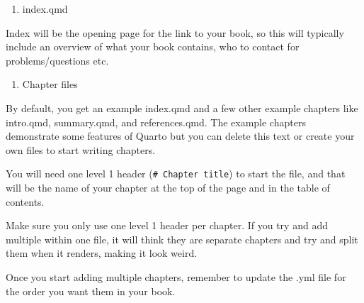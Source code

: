 \documentclass[
  letterpaper,
  DIV=11,
  numbers=noendperiod]{scrreprt}
\providecommand{\tightlist}{%
  \setlength{\itemsep}{0pt}\setlength{\parskip}{0pt}}\usepackage{longtable,booktabs,array}
\begin{document}
\begin{enumerate}
\def\labelenumi{\arabic{enumi}.}
\setcounter{enumi}{1}
\tightlist
\item
  index.qmd
\end{enumerate}

Index will be the opening page for the link to your book, so this will
typically include an overview of what your book contains, who to contact
for problems/questions etc.

\begin{enumerate}
\def\labelenumi{\arabic{enumi}.}
\setcounter{enumi}{2}
\tightlist
\item
  Chapter files
\end{enumerate}

By default, you get an example index.qmd and a few other example
chapters like intro.qmd, summary.qmd, and references.qmd. The example
chapters demonstrate some features of Quarto but you can delete this
text or create your own files to start writing chapters.

You will need one level 1 header (\texttt{\#\ Chapter\ title}) to start
the file, and that will be the name of your chapter at the top of the
page and in the table of contents.

\begin{tcolorbox}[enhanced jigsaw, colbacktitle=quarto-callout-warning-color!10!white, titlerule=0mm, leftrule=.75mm, title=\textcolor{quarto-callout-warning-color}{\faExclamationTriangle}\hspace{0.5em}{Warning}, breakable, bottomrule=.15mm, opacitybacktitle=0.6, rightrule=.15mm, opacityback=0, arc=.35mm, colframe=quarto-callout-warning-color-frame, toptitle=1mm, bottomtitle=1mm, toprule=.15mm, left=2mm, colback=white, coltitle=black]

Make sure you only use one level 1 header per chapter. If you try and
add multiple within one file, it will think they are separate chapters
and try and split them when it renders, making it look weird.

\end{tcolorbox}

Once you start adding multiple chapters, remember to update the .yml
file for the order you want them in your book.
\end{document}
